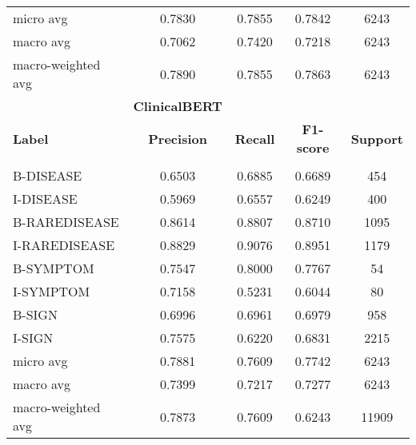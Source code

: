 \documentclass[preprint,12pt]{elsarticle}
\begin{document}
\begin{table}[H]
\begin{tabular}{lcccc}
    micro avg & 0.7830 & 0.7855 & 0.7842 & 6243\\
    macro avg & 0.7062 & 0.7420 & 0.7218 & 6243\\
 macro-weighted avg & 0.7890 & 0.7855 & 0.7863 & 6243\\


\hline

& \multicolumn{1}{c}{\textbf{ClinicalBERT}} \\
{\bf Label} & {\bf Precision} &
{\bf Recall} &
{\bf F1-score} & {\bf Support} \\
\hline\\[-8pt]
B-DISEASE & 0.6503 & 0.6885 & 0.6689 &   454\\
I-DISEASE & 0.5969 & 0.6557 & 0.6249 &  400\\
B-RAREDISEASE & 0.8614 & 0.8807 & 0.8710 &  1095\\
I-RAREDISEASE & 0.8829 & 0.9076 & 0.8951 &  1179\\
    B-SYMPTOM & 0.7547 & 0.8000 & 0.7767 &    54\\
    I-SYMPTOM & 0.7158 & 0.5231 & 0.6044 &   80\\
       B-SIGN & 0.6996 & 0.6961 & 0.6979 &   958\\
       I-SIGN & 0.7575 & 0.6220 & 0.6831 &  2215\\
    

    micro avg & 0.7881 & 0.7609 & 0.7742 & 6243\\
    macro avg & 0.7399 & 0.7217 & 0.7277 & 6243\\
 macro-weighted avg & 0.7873 & 0.7609 & 0.6243 & 11909\\

\hline
\end{tabular}
\end{table}


% 
%
\end{document}
